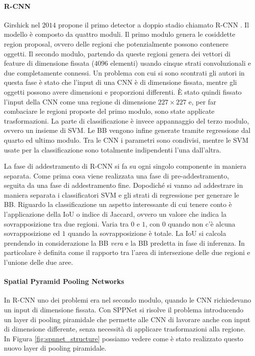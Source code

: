 \paragraph{R-CNN} 
Girshick nel $2014$ propone il primo detector a doppio stadio chiamato R-CNN \cite{girshick2014rich}. Il modello è composto da quattro moduli. Il primo modulo genera le cosiddette region proposal, ovvero delle regioni che potenzialmente possono contenere oggetti. Il secondo modulo, partendo da queste regioni genera dei vettori di feature di dimensione fissata ($4096$ elementi) usando cinque strati convoluzionali e due completamente connessi. Un problema con cui si sono scontrati gli autori in questa fase è stato che l'input di una \ac{CNN} è di dimensione fissata, mentre gli oggetti possono avere dimensioni e proporzioni differenti. È stato quindi fissato l'input della \ac{CNN} come una regione di dimensione $227 \times 227$ e, per far combaciare le regioni proposte del primo modulo, sono state applicate trasformazioni.
La parte di classificazione è invece appannaggio del terzo modulo, ovvero  un insieme di \ac{SVM}. Le \ac{BB} vengono infine generate tramite regressione dal quarto ed ultimo modulo. Tra le \ac{CNN} i parametri sono condivisi, mentre le \ac{SVM} usate per la classificazione sono totalmente indipendenti l'una dall'altra.

La fase di addestramento di R-CNN si fa su ogni singolo componente in maniera separata. Come prima cosa viene realizzata una fase di pre-addestramento, seguita da una fase di addestramento fine. Dopodiché si vanno ad addestrare in maniera separata i classificatori \ac{SVM} e gli strati di regressione per generare le \ac{BB}.
Riguardo la classificazione un aspetto interessante di cui tenere conto è l'applicazione della \ac{IoU} o indice di Jaccard, ovvero un valore che indica la sovrapposizione tra due regioni. Varia tra $0$ e $1$, con $0$ quando non c'è alcuna sovrapposizione ed $1$ quando la sovrapposizione è totale. La \ac{IoU} si calcola prendendo in considerazione la \ac{BB} \textit{vera} e la \ac{BB} predetta in fase di inferenza. In particolare è definita come il rapporto tra l'area di intersezione delle due regioni e l'unione delle due aree. 

\paragraph{Spatial Pyramid Pooling Networks} In R-CNN uno dei problemi era nel secondo modulo, quando le \ac{CNN} richiedevano un input di dimensione fissata. Con \acf{SPPNet} \cite{he2015spatial} si risolve il problema introducendo un layer di pooling piramidale che permette alle \ac{CNN} di lavorare anche con input di dimensione differente, senza necessità di applicare trasformazioni alla regione. In Figura \ref{fig:spnnet_structure} possiamo vedere come è stato realizzato questo nuovo layer di pooling piramidale. 

